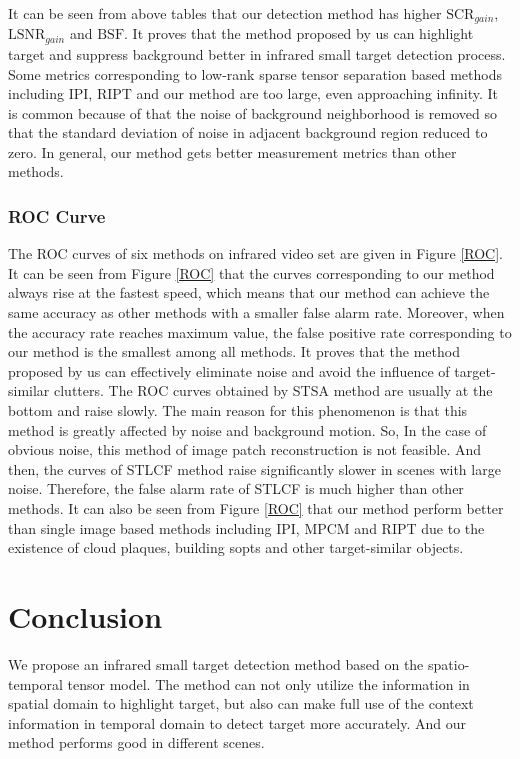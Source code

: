 \documentclass[journal]{IEEEtran}
\begin{document}
It can be seen from above tables that our detection method has higher $\mbox{SCR}_{gain}$, $\mbox{LSNR}_{gain}$ and $\mbox{BSF}$. It proves that the method proposed by us can highlight target and suppress background better in infrared small target detection process. Some metrics corresponding to low-rank sparse tensor separation based methods including IPI, RIPT and our method are too large, even approaching infinity. It is common because of that the noise of background neighborhood is removed so that the standard deviation of noise in adjacent background region reduced to zero. In general, our method gets better measurement metrics than other methods.

\subsubsection{ROC Curve}
The ROC curves of six methods on infrared video set are given in Figure \ref{ROC}. It can be seen from Figure \ref{ROC} that the curves corresponding to our method always rise at the fastest speed, which means that our method can achieve the same accuracy as other methods with a smaller false alarm rate. Moreover, when the accuracy rate reaches maximum value, the false positive rate corresponding to our method is the smallest among all methods. It proves that the method proposed by us can effectively eliminate noise and avoid the influence of target-similar clutters. The ROC curves obtained by STSA method are usually at the bottom and raise slowly. The main reason for this phenomenon is that this method is greatly affected by noise and background motion. So, In the case of obvious noise, this method of image patch reconstruction is not feasible. And then, the curves of STLCF method raise significantly slower in scenes with large noise. Therefore, the false alarm rate of STLCF is much higher than other methods. It can also be seen from Figure \ref{ROC} that our method perform better than single image based methods including IPI, MPCM and RIPT due to the existence of cloud plaques, building sopts and other target-similar objects.


\section{Conclusion}
We propose an infrared small target detection method based on the spatio-temporal tensor model. The method can not only utilize the information in spatial domain to highlight target, but also can make full use of the context information in temporal domain to detect target more accurately. And our method performs good in different scenes.
\end{document}
